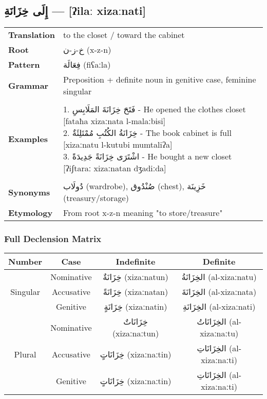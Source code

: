 \documentclass[letter,12pt]{article}
\begin{document}
\subsection{\textarabic{إِلَى خِزَانَةِ} — [ʔilaː xizaːnati]}
\begin{tabular}{p{3cm}p{10cm}}
\toprule
\textbf{Translation} & to the closet / toward the cabinet \\
\textbf{Root} & \textarabic{خ-ز-ن} (x-z-n) \\
\textbf{Pattern} & \textarabic{فِعَالَة} (fiʕaːla) \\
\textbf{Grammar} & Preposition + definite noun in genitive case, feminine singular \\
\midrule \\
\textbf{Examples} & \makecell[l]{\parbox{9.5cm}{
1. \textarabic{فَتَحَ خِزَانَةَ المَلَابِسِ} - He opened the clothes closet [fataħa xizaːnata l-malaːbisi]\\
2. \textarabic{خِزَانَةُ الكُتُبِ مُمْتَلِئَةٌ} - The book cabinet is full [xizaːnatu l-kutubi mumtaliʔa]\\
3. \textarabic{اشْتَرَى خِزَانَةً جَدِيدَةً} - He bought a new closet [ʔiʃtaraː xizaːnatan dʒadiːda]
}} \\
\midrule \\
\textbf{Synonyms} & \textarabic{دُولَاب} (wardrobe), \textarabic{صُنْدُوق} (chest), \textarabic{خَزِينَة} (treasury/storage) \\
\textbf{Etymology} & From root x-z-n meaning "to store/treasure" \\
\bottomrule
\end{tabular}

\subsubsection*{Full Declension Matrix}
\begin{tabular}{|c|c|c|c|}
\hline
\textbf{Number} & \textbf{Case} & \textbf{Indefinite} & \textbf{Definite} \\
\hline
\multirow{3}{*}{Singular}
 & Nominative   & \textarabic{خِزَانَةٌ} (xizaːnatun) & \textarabic{الخِزَانَةُ} (al-xizaːnatu) \\
 & Accusative   & \textarabic{خِزَانَةً} (xizaːnatan) & \textarabic{الخِزَانَةَ} (al-xizaːnata) \\
 & Genitive     & \textarabic{خِزَانَةٍ} (xizaːnatin) & \textarabic{الخِزَانَةِ} (al-xizaːnati) \\
\hline
\multirow{3}{*}{Plural}
 & Nominative   & \textarabic{خِزَانَاتٌ} (xizaːnaːtun) & \textarabic{الخِزَانَاتُ} (al-xizaːnaːtu) \\
 & Accusative   & \textarabic{خِزَانَاتٍ} (xizaːnaːtin) & \textarabic{الخِزَانَاتِ} (al-xizaːnaːti) \\
 & Genitive     & \textarabic{خِزَانَاتٍ} (xizaːnaːtin) & \textarabic{الخِزَانَاتِ} (al-xizaːnaːti) \\
\hline
\end{tabular}
\end{document}
